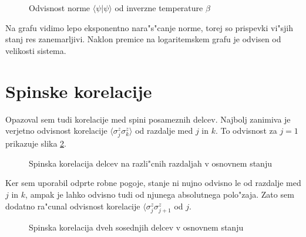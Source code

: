 \documentclass[a4paper,10pt]{article}
\begin{document}
\begin{figure}[H]
\centering

\caption{Odvisnost norme $\langle \psi | \psi \rangle$ od inverzne temperature $\beta$}
\label{fig:norma}
\end{figure}

Na grafu vidimo lepo eksponentno nara"s"canje norme, torej so prispevki vi"sjih stanj res zanemarljivi. 
Naklon premice na logaritemskem grafu je odvisen od velikosti sistema. 

\section{Spinske korelacije}

Opazoval sem tudi korelacije med spini posameznih delcev. 
Najbolj zanimiva je verjetno odvisnost korelacije $\langle \sigma_j^z \sigma_k^z \rangle$ od razdalje med $j$ in $k$. 
To odvisnost za $j=1$ prikazuje slika \ref{fig:spin-1k}. 

\begin{figure}[H]
\centering

\caption{Spinska korelacija delcev na razli"cnih razdaljah v osnovnem stanju}
\label{fig:spin-1k}
\end{figure}

Ker sem uporabil odprte robne pogoje, stanje ni nujno odvisno le od razdalje med $j$ in $k$, ampak je lahko odvisno tudi od njunega absolutnega polo"zaja. 
Zato sem dodatno ra"cunal odvisnost korelacije $\langle \sigma_j^z \sigma_{j+1}^z$ od $j$. 

\begin{figure}[H]
\centering

\caption{Spinska korelacija dveh sosednjih delcev v osnovnem stanju}
\label{fig:spin-jp}
\end{figure}
\end{document}
